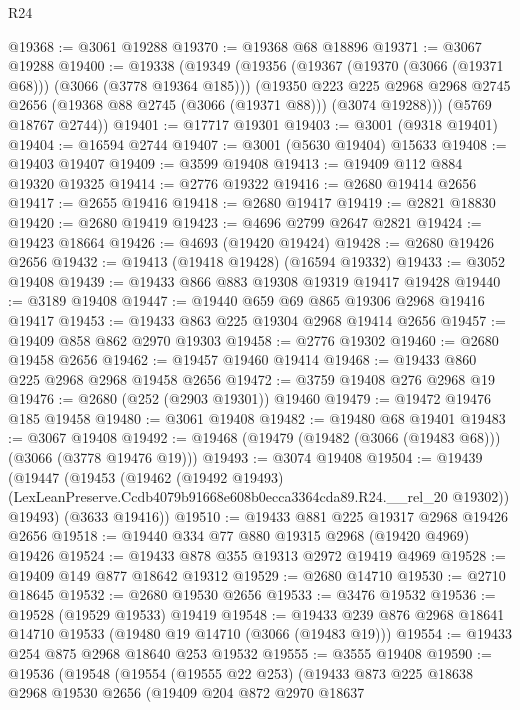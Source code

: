 \begin{lexlean}{R24}
\begin{coremodule}
@19368 := @3061 @19288
@19370 := @19368 @68 @18896
@19371 := @3067 @19288
@19400 := @19338
    (@19349
      (@19356
        (@19367 (@19370 (@3066 (@19371 @68))) (@3066 (@3778 @19364 @185)))
        (@19350
          @223
          @225
          @2968
          @2968
          @2745
          @2656
          (@19368 @88 @2745 (@3066 (@19371 @88)))
          (@3074 @19288)))
      (@5769 @18767 @2744))
@19401 := @17717 @19301
@19403 := @3001 (@9318 @19401)
@19404 := @16594 @2744
@19407 := @3001 (@5630 @19404) @15633
@19408 := @19403 @19407
@19409 := @3599 @19408
@19413 := @19409 @112 @884 @19320 @19325
@19414 := @2776 @19322
@19416 := @2680 @19414 @2656
@19417 := @2655 @19416
@19418 := @2680 @19417
@19419 := @2821 @18830
@19420 := @2680 @19419
@19423 := @4696 @2799 @2647 @2821
@19424 := @19423 @18664
@19426 := @4693 (@19420 @19424)
@19428 := @2680 @19426 @2656
@19432 := @19413 (@19418 @19428) (@16594 @19332)
@19433 := @3052 @19408
@19439 := @19433 @866 @883 @19308 @19319 @19417 @19428
@19440 := @3189 @19408
@19447 := @19440 @659 @69 @865 @19306 @2968 @19416 @19417
@19453 := @19433 @863 @225 @19304 @2968 @19414 @2656
@19457 := @19409 @858 @862 @2970 @19303
@19458 := @2776 @19302
@19460 := @2680 @19458 @2656
@19462 := @19457 @19460 @19414
@19468 := @19433 @860 @225 @2968 @2968 @19458 @2656
@19472 := @3759 @19408 @276 @2968 @19
@19476 := @2680 (@252 (@2903 @19301)) @19460
@19479 := @19472 @19476 @185 @19458
@19480 := @3061 @19408
@19482 := @19480 @68 @19401
@19483 := @3067 @19408
@19492 := @19468 (@19479 (@19482 (@3066 (@19483 @68))) (@3066 (@3778 @19476 @19)))
@19493 := @3074 @19408
@19504 := @19439
    (@19447
      (@19453
        (@19462
          (@19492 @19493)
          (LexLeanPreserve.Ccdb4079b91668e608b0ecca3364cda89.R24.__rel_20 @19302))
        @19493)
      (@3633 @19416))
@19510 := @19433 @881 @225 @19317 @2968 @19426 @2656
@19518 := @19440 @334 @77 @880 @19315 @2968 (@19420 @4969) @19426
@19524 := @19433 @878 @355 @19313 @2972 @19419 @4969
@19528 := @19409 @149 @877 @18642 @19312
@19529 := @2680 @14710
@19530 := @2710 @18645
@19532 := @2680 @19530 @2656
@19533 := @3476 @19532
@19536 := @19528 (@19529 @19533) @19419
@19548 := @19433 @239 @876 @2968 @18641 @14710 @19533 (@19480 @19 @14710 (@3066 (@19483 @19)))
@19554 := @19433 @254 @875 @2968 @18640 @253 @19532
@19555 := @3555 @19408
@19590 := @19536
    (@19548
      (@19554
        (@19555 @22 @253)
        (@19433
          @873
          @225
          @18638
          @2968
          @19530
          @2656
          (@19409
            @204
            @872
            @2970
            @18637

\end{coremodule}
\end{lexlean}
